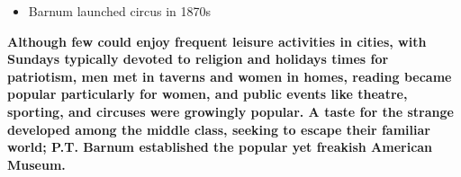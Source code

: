 \documentclass[a4paper]{article}
\begin{document}
{\begin{itemize}
\begin{itemize}
\begin{itemize}
            \end{itemize}
            \item Barnum launched circus in 1870s
        \end{itemize}
    \end{itemize}
    \textbf{Although few could enjoy frequent leisure activities in cities, with Sundays typically devoted to religion and holidays times for patriotism, men met in taverns and women in homes, reading became popular particularly for women, and public events like theatre, sporting, and circuses were growingly popular. A taste for the strange developed among the middle class, seeking to escape their familiar world; P.T. Barnum established the popular yet freakish American Museum.}}
    
\end{document}
